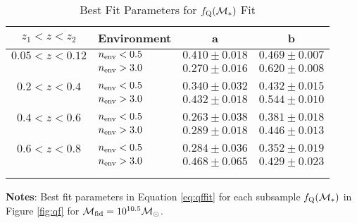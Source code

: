 \documentclass{emulateapj}
\def \lowenvthresh {0.5}
\def \highenvthresh {3.0}
\begin{document}
\begin{table} 
  \caption{Best Fit Parameters for $f_{\rm{Q}}(\mathcal{M}_{*})$ Fit}
  \label{tab:bestfitparam}
  \begin{center}
    \leavevmode
    \begin{tabular}{clcc} \hline \hline              
    $z_1 < z < z_2$ &Environment        &a  &b  \\ \hline 
$0.05 < z< 0.12$ &$n_{\rm{env}} < \lowenvthresh$ & $0.410 \pm 0.018$ & $0.469 \pm 0.007$ \\
               &$n_{\rm{env}} > \highenvthresh$ & $0.270 \pm 0.016$ & $0.620 \pm 0.008$ \\ 
                              &               &                       &                           \\ \hline   
$0.2 < z <0.4$ & $n_{\rm{env}} < \lowenvthresh$ & $0.340 \pm 0.032$ & $0.432 \pm 0.015$ \\
               &$n_{\rm{env}} > \highenvthresh$ & $0.432 \pm 0.018$ & $0.544 \pm 0.010$ \\
               &               &                       &                           \\ \hline
$0.4 < z < 0.6$      &$n_{\rm{env}} < \lowenvthresh$ & $0.263 \pm 0.038$ & $0.381 \pm 0.018$ \\
               &$n_{\rm{env}} > \highenvthresh$ & $0.289 \pm 0.018$ & $0.446 \pm 0.013$ \\
               &               &                       &                           \\ \hline
$0.6 < z < 0.8$      &$n_{\rm{env}} < \lowenvthresh$ & $0.284 \pm 0.036$ & $0.352 \pm 0.019$ \\
               &$n_{\rm{env}} > \highenvthresh$            & $0.468 \pm 0.065$ & $0.429 \pm 0.023$ \\
               &               &                       &                           \\ \hline
  \multicolumn{4}{l}{}                                             \\       
    \end{tabular} \par
    \end{center}
    {\bf Notes}: Best fit parameters in Equation \ref{eq:qffit} for each subsample $f_{\rm{Q}}(\mathcal{M}_{*})$ in Figure \ref{fig:qf} for $\mathcal{M}_{\rm{fid}} = 10^{10.5} \mathcal{M}_{\odot}$.
\end{table}
\end{document}

